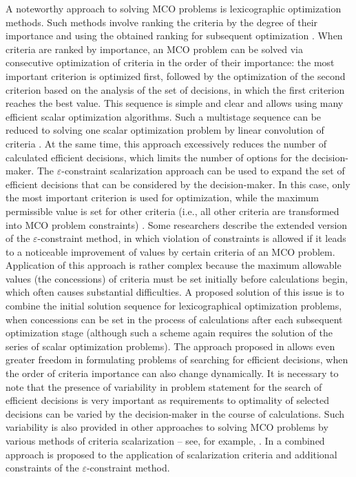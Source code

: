 \documentclass[smallextended]{svjour3}       %
\begin{document}
A noteworthy approach to solving MCO problems is lexicographic optimization methods. Such methods involve ranking the criteria by the degree of their importance and using the obtained ranking for subsequent optimization \cite{c3}. When criteria are ranked by importance, an MCO problem can be solved via consecutive optimization of criteria in the order of their importance: the most important criterion is optimized first, followed by the optimization of the second criterion based on the analysis of the set of decisions, in which the first criterion reaches the best value. This sequence is simple and clear and allows using many efficient scalar optimization algorithms. Such a multistage sequence can be reduced to solving one scalar optimization problem by linear convolution of criteria \cite{c38}. At the same time, this approach excessively reduces the number of calculated efficient decisions, which limits the number of options for the decision-maker. The $\varepsilon$-constraint scalarization approach can be used to expand the set of efficient decisions that can be considered by the decision-maker. In this case, only the most important criterion is used for optimization, while the maximum permissible value is set for other criteria (i.e., all other criteria are transformed into MCO problem constraints) \cite{c39,c40}. Some researchers \cite{c41} describe the extended version of the $\varepsilon$-constraint method, in which violation of constraints is allowed if it leads to a noticeable improvement of values by certain criteria of an MCO problem. Application of this approach is rather complex because the maximum allowable values (the concessions) of criteria must be set initially before calculations begin, which often causes substantial difficulties. A proposed solution \cite{c42} of this issue is to combine the initial solution sequence for lexicographical optimization problems, when concessions can be set in the process of calculations after each subsequent optimization stage (although such a scheme again requires the solution of the series of scalar optimization problems). The approach proposed in \cite{c43} allows even greater freedom in formulating problems of searching for efficient decisions, when the order of criteria importance can also change dynamically. It is necessary to note that the presence of variability in problem statement for the search of efficient decisions is very important as requirements to optimality of selected decisions can be varied by the decision-maker in the course of calculations. Such variability is also provided in other approaches to solving MCO problems by various methods of criteria scalarization -- see, for example, \cite{c31,c44}. In \cite{c1} a combined approach is proposed to the application of scalarization criteria and additional constraints of the $\varepsilon$-constraint method.
\end{document}
